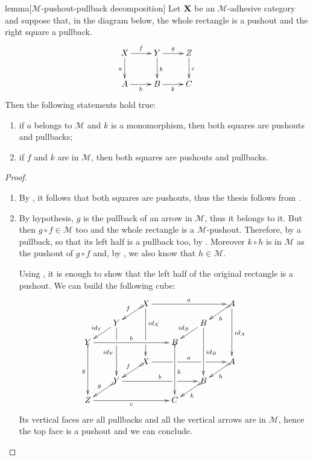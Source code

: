 \documentclass[a4paper,UKenglish,cleveref,pdftex, thm-restate,numberwithinsect]{lipics}
\newcommand{\id}[1]{\mathsf{id}_{#1}}
\def\X{\textbf {\textup{X}}}
\def\Y{\textbf {\textup{Y}}}
\begin{document}
\begin{theoremEnd}[category=sec2]{lemma}[$\mathcal{M}$-pushout-pullback decomposition]\label{lem:popb} Let $\X$ be an $\mathcal{M}$-adhesive category  and suppose that, in the diagram below, the whole rectangle is a pushout and the right square a pullback.
\[\xymatrix{X \ar[d]_{a} \ar[r]^{f}& \ar[r]^{g} Y \ar[d]^{b}& Z \ar[d]^{c}\\ A \ar[r]_{h}& B \ar[r]_{k}& C}\]
	Then the following statements hold true:
	\begin{enumerate}
\item if $a$ belongs to $\mathcal{M}$ and $k$ is a monomorphism,  then both squares are pushouts and pullbacks;
\item if $f$ and $k $ are in  $\mathcal{M}$, then both squares are pushouts and pullbacks.
	\end{enumerate}
\end{theoremEnd}
\begin{proof}\begin{proofEnd}
		\begin{enumerate}
			\item By , it follows that both squares are pushouts, thus the thesis follows from .
			\item By hypothesis, $g$ is the pullback of an arrow in $\mathcal{M}$, thus it belongs to it. But then $g\circ f\in \mathcal{M}$ too  and the whole rectangle is a $\mathcal{M}$-pushout. Therefore, by  a pullback, so that its left half is a pullback too, by . Moreover $k\circ h$ is in $\mathcal{M}$ as the pushout of $g\circ f$ and, by , we also know that $h\in \mathcal{M}$.  
			
			Using , it is enough to show that the left half of the original rectangle is a pushout. We can build the following cube:
			\[\xymatrix@C=20pt@R=10pt{ & &X\ar@{>->}[dl]_{f} \ar[ddd]^(.333333){\id{X}}|(.666666)\hole\ar[rrr]^{a} &&&A \ar[ddd]^{\id{A}} \ar@{>->}[dl]^{h}\\& Y\ar[dl]_{\id{Y}} \ar[ddd]|(.333333)\hole_{\id{Y}} &&&B \ar[ddd]^{\id{B}} \ar[dl]_{\id{B}} \\Y \ar@{>->}[ddd]_{g} \ar[rrr]^{b}&&& B\ar@{>->}[ddd]^{k}\\&&X \ar[rrr]|(.34)\hole^{a}|(.67)\hole \ar@{>->}[dl]_{f}&&& A \ar@{>->}[dl]^{h}\\ & Y \ar[rrr]|(.67)\hole^{b} \ar@{>->}[dl]_{g}&&& B \ar@{>->}[dl]^{k}\\ Z\ar[rrr]_{c} &&& C}\]
			Its vertical faces are all pullbacks and all the vertical arrows are in $\mathcal{M}$, hence the top face is a pushout and we can conclude. \qedhere 
		\end{enumerate}
	\end{proofEnd}
\end{proof}
\end{document}

